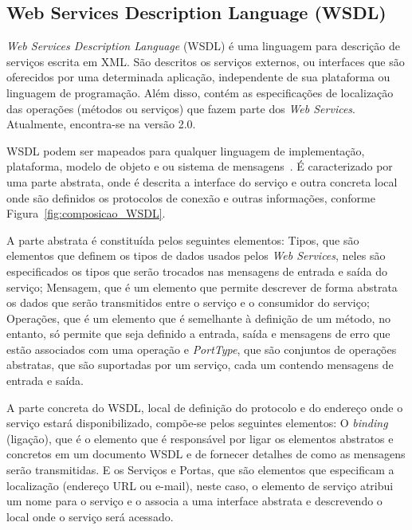 \subsection{Web Services Description Language (WSDL)}

\emph{Web Services Description Language} (WSDL) é uma linguagem para descrição de serviços escrita em XML. São descritos os serviços externos, ou interfaces que são oferecidos por uma determinada aplicação, independente de sua plataforma ou linguagem de programação. Além disso, contém as especificações de localização das operações (métodos ou serviços) que fazem parte dos \emph{Web Services}. Atualmente, encontra-se na versão 2.0.

WSDL podem ser mapeados para qualquer linguagem de implementação, plataforma, modelo de objeto e ou sistema de mensagens~\cite{Bertino2010}. É caracterizado por uma parte abstrata, onde é descrita a interface do serviço e outra concreta local onde são definidos os protocolos de conexão e outras informações, conforme Figura~\ref{fig:composicao_WSDL}.

A parte abstrata é constituída pelos seguintes elementos: Tipos, que são elementos que definem os tipos de dados usados pelos \emph{Web Services}, neles são especificados os tipos que serão trocados nas mensagens de entrada e saída do serviço; Mensagem, que é um elemento que permite descrever de forma abstrata os dados que serão transmitidos entre o serviço e o consumidor do serviço; Operações, que é um elemento que é semelhante à definição de um método, no entanto, só permite que seja definido a entrada, saída e mensagens de erro que estão associados com uma operação e \emph{PortType}, que são conjuntos de operações abstratas, que são suportadas por um serviço, cada um contendo mensagens de entrada e saída.

A parte concreta do WSDL, local de definição do protocolo e do endereço onde o serviço estará disponibilizado, compõe-se pelos seguintes elementos: O \emph{binding} (ligação), que é o elemento que é responsável por ligar os elementos abstratos e concretos em um documento WSDL e de fornecer detalhes de como as mensagens serão transmitidas. E os Serviços e Portas, que são elementos que especificam a localização (endereço URL ou e-mail), neste caso, o elemento de serviço atribui um nome para o serviço e o associa a uma interface abstrata e descrevendo o local onde o serviço será acessado.

